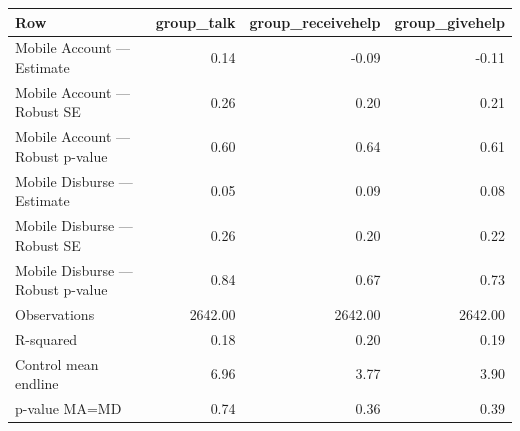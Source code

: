 
\begin{tabular}{lrrr}
\toprule
Row & group\_talk & group\_receivehelp & group\_givehelp\\
\midrule
Mobile Account — Estimate & 0.14 & -0.09 & -0.11\\
Mobile Account — Robust SE & 0.26 & 0.20 & 0.21\\
Mobile Account — Robust p-value & 0.60 & 0.64 & 0.61\\
Mobile Disburse — Estimate & 0.05 & 0.09 & 0.08\\
Mobile Disburse — Robust SE & 0.26 & 0.20 & 0.22\\
\addlinespace
Mobile Disburse — Robust p-value & 0.84 & 0.67 & 0.73\\
Observations & 2642.00 & 2642.00 & 2642.00\\
R-squared & 0.18 & 0.20 & 0.19\\
Control mean endline & 6.96 & 3.77 & 3.90\\
p-value MA=MD & 0.74 & 0.36 & 0.39\\
\bottomrule
\end{tabular}
